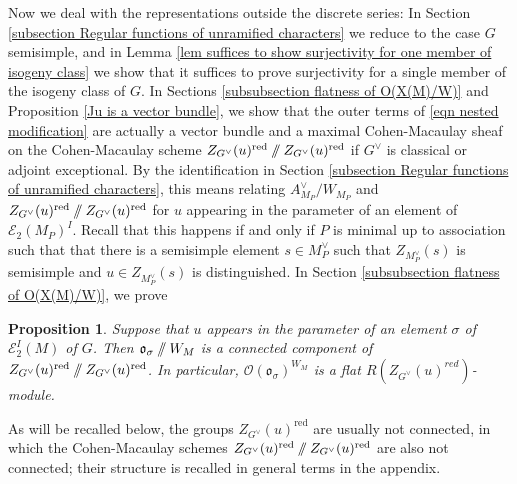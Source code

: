 \documentclass[10pt]{article}
\newcommand{\git}{\mathbin{
  \mathchoice{/\mkern-6mu/}%
    {/\mkern-6mu/}%
    {/\mkern-5mu/}%
    {/\mkern-5mu/}}}%
\newcommand{\Ee}{\mathcal{E}}
\newcommand{\Oo}{\mathcal{O}}
\newcommand{\Sn}{\mathfrak{S}}
\newtheorem{prop}{Proposition}
\newtheorem{lem}{Lemma}
\theoremstyle{definition}
\theoremstyle{remark}
\newcommand{\Zur}{Z_{G^\vee}(u)^{\mathrm{red}}}
\begin{document}
Now we deal with the representations outside the discrete series:
In Section \ref{subsection Regular functions of unramified characters}
we reduce to the case $G$ semisimple, and in Lemma \ref{lem suffices to show surjectivity for one 
member of isogeny class} we show that it suffices to prove surjectivity for a single member of the isogeny
class of $G$. In Sections \ref{subsubsection flatness of O(X(M)/W)} and Proposition \ref{Ju is a vector bundle}, 
we show that the outer terms of \eqref{eqn nested modification} are actually a vector bundle and a maximal Cohen-Macaulay sheaf on the Cohen-Macaulay scheme $\Zur\git\Zur$ if $G^\vee$ is 
classical or adjoint exceptional. By the identification in Section \ref{subsection Regular functions of unramified characters},
this means relating $A_{M_P}^\vee/{W_{M_P}}$ and $\Zur\git\Zur$ 
for $u$ appearing in the parameter of an element of $\Ee_2(M_P)^I$. 
Recall that this happens if and only if $P$ is minimal up to association such that 
that there is a semisimple element $s\in M_P^\vee$ such that $Z_{M_P^\vee}(s)$ is semisimple and 
$u\in Z_{M_P^\vee}(s)$ is distinguished. In Section \ref{subsubsection flatness of O(X(M)/W)}, we prove
%
\begin{prop}
\label{prop quotient of unramified characters is flat}
Suppose that $u$ appears in the parameter of an element $\sigma$ of $\Ee_2^I(M)$ of $G$. Then $\mathfrak{o}_\sigma\git W_M$ is a 
connected component of $\Zur\git\Zur$.
In particular, $\Oo(\mathfrak{o}_\sigma)^{W_M}$ is a flat $R(Z_{G^\vee}(u)^{red})$-module.
\end{prop}
%

As will be recalled below, the groups $\Zur$ are usually not connected, in which the Cohen-Macaulay schemes $\Zur\git\Zur$ are also not connected; their structure is recalled in general terms in the appendix.
\end{document}
